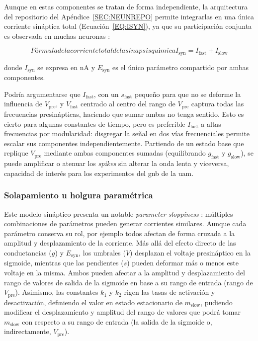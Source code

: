 Aunque en \cite{Golowasch1999} estas componentes se tratan de forma independiente, la arquitectura del repositorio del Apéndice~\ref{SEC:NEUNREPO} permite integrarlas en una única corriente sináptica total (Ecuación~\ref{EQ:ISYN}), ya que su participación conjunta es observada en muchas neuronas \cite{Selverston2000}:

\begin{equation}[EQ:ISYN]{Fórmula de la corriente total de la sinapsis química}
    \boxed{ I_{\mathrm{syn}} = I_{\mathrm{fast}} + I_{\mathrm{slow}} }
\end{equation}

\noindent donde \(I_{\mathrm{syn}}\) se expresa en nA y \(E_{\mathrm{syn}}\) es el único parámetro compartido por ambas componentes.

Podría argumentarse que \(I_{\mathrm{fast}}\), con un \(s_{\mathrm{fast}}\) pequeño para que no se deforme la influencia de \(V_{\mathrm{pre}}\), y \(V_{\mathrm{fast}}\) centrado al centro del rango de \(V_{\mathrm{pre}}\) captura todas las frecuencias presinápticas, haciendo que sumar ambas no tenga sentido. Esto es cierto para algunas constantes de tiempo, pero es preferible \(I_{\mathrm{fast}}\) a altas frecuencias por modularidad: disgregar la señal en dos vías frecuenciales permite escalar sus componentes independientemente. Partiendo de un estado base que replique \(V_{\mathrm{pre}}\) mediante ambas componentes sumadas (equilibrando \(g_{\mathrm{fast}}\) y \(g_{\mathrm{slow}}\)), se puede amplificar o atenuar los \textit{spikes} sin alterar la onda lenta y viceversa, capacidad de interés para los experimentos del \ac{gnb} de la \ac{uam}.

\subsubsection{Solapamiento u holgura paramétrica\label{SUBSUBSEC:PARAMETER_SLOPPINESS}}

Este modelo sináptico presenta un notable \textit{parameter sloppiness} \cite{Gutenkunst2007}: múltiples combinaciones de parámetros pueden generar corrientes similares. Aunque cada parámetro conserva su rol, por ejemplo todos afectan de forma cruzada a la amplitud y desplazamiento de la corriente. Más allá del efecto directo de las conductancias ($g$) y $E_{\mathrm{syn}}$, los umbrales ($V$) desplazan el voltaje presináptico en la sigmoide, mientras que las pendientes ($s$) pueden deformar más o menos este voltaje en la misma. Ambos pueden afectar a la amplitud y desplazamiento del rango de valores de salida de la sigmoide en base a su rango de entrada (rango de \(V_{\mathrm{pre}}\)). Asimismo, las constantes $k_1$ y $k_2$ rigen las tasas de activación y desactivación, definiendo el valor en estado estacionario de $m_{\mathrm{slow}}$, pudiendo modificar el desplazamiento y amplitud del rango de valores que podrá tomar $m_{\mathrm{slow}}$ con respecto a su rango de entrada (la salida de la sigmoide o, indirectamente, \(V_{\mathrm{pre}}\)).

